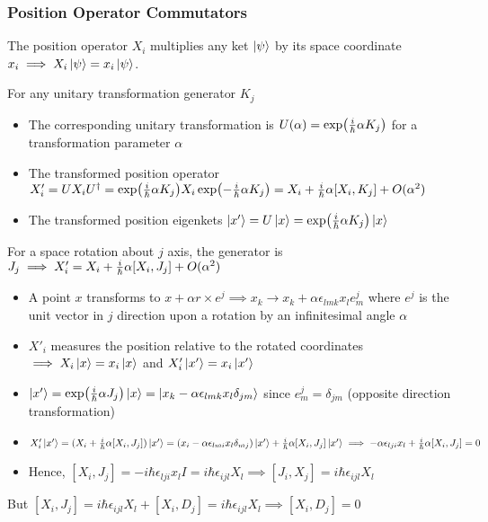 \documentclass[8pt,t,mathserif,aspectratio=169]{beamer}
\begin{document}
\begin{frame}
  \frametitle{Position Operator Commutators}
  \vspace{1mm}
  The position operator $X_i$ multiplies any ket $\ket{\psi}$ by its space coordinate $x_i \implies X_i \ket{\psi} = x_i \ket{\psi}$. 

  For any unitary transformation generator $K_j$
  \begin{itemize}
    \item The corresponding unitary transformation is $U(\alpha) = \exp({i \over \hbar} \alpha K_j)$ for a transformation parameter $\alpha$
    \item The transformed position operator $X'_i = U X_i U^{\dagger} = \exp({i \over \hbar} \alpha K_j) X_i \exp(-{i \over \hbar} \alpha K_j) = X_i + {i \over \hbar} \alpha [X_i,K_j] + O(\alpha^2)$
    \item The transformed position eigenkets $\ket{x'} = U \ket{x} = \exp({i \over \hbar} \alpha K_j) \ket{x}$
  \end{itemize}
  For a space rotation about $j$ axis, the generator is $J_j \implies X'_i = X_i + {i \over \hbar} \alpha [X_i,J_j] + O(\alpha^2)$
  \begin{itemize}
    \item A point $x$ transforms to $x + \alpha r \times e^j \implies x_k \to x_k + \alpha \epsilon_{lmk} x_l e^j_m$ where $e^j$ is the unit vector in $j$ direction upon a rotation by an infinitesimal angle $\alpha$
    \item $X'_i$ measures the position relative to the rotated coordinates $\implies X_i \ket{x} = x_i \ket{x}$ and $X'_i \ket{x'} = x_i \ket{x'}$
    \item $\ket{x'} = \exp({i \over \hbar} \alpha J_j) \ket{x} = \ket{x_k - \alpha \epsilon_{lmk} x_l \delta_{jm}}$ since $e^j_m = \delta_{jm}$ (opposite direction transformation)
    \item $X'_i \ket{x'} = (X_i + {i \over \hbar} \alpha [X_i,J_j])\ket{x'} = (x_i - \alpha \epsilon_{lmi} x_l \delta_{mj})\ket{x'} + {i \over \hbar} \alpha [X_i,J_j] \ket{x'} \implies -\alpha \epsilon_{lji} x_l + {i \over \hbar} \alpha [X_i,J_j] = 0$
    \item Hence, $[X_i,J_j] = -i \hbar \epsilon_{lji} x_l I = i \hbar \epsilon_{ijl} X_l \implies [J_i,X_j] = i \hbar \epsilon_{ijl} X_l$
  \end{itemize}
  But $[X_i,J_j] = i \hbar \epsilon_{ijl} X_l + [X_i,D_j] = i \hbar \epsilon_{ijl} X_l \implies [X_i,D_j] = 0$ 
\end{frame}
\end{document}
